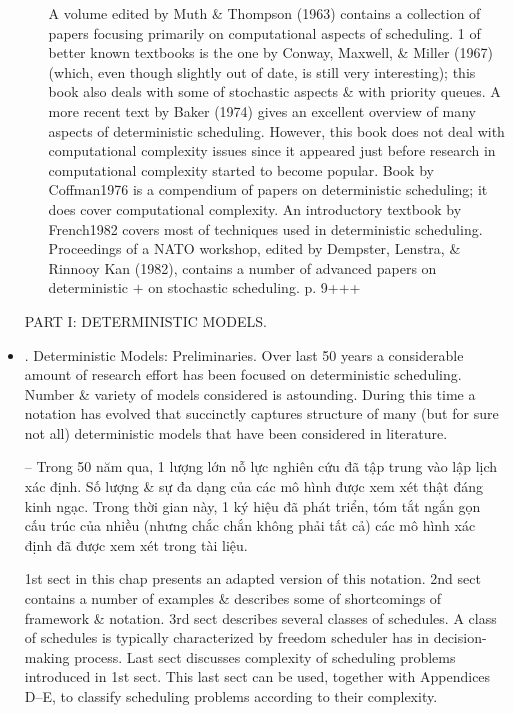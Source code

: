 \documentclass{article}
\begin{document}
\begin{itemize}
\begin{itemize}
        A volume edited by Muth \& Thompson (1963) contains a collection of papers focusing primarily on computational aspects of scheduling. 1 of better known textbooks is the one by Conway, Maxwell, \& Miller (1967) (which, even though slightly out of date, is still very interesting); this book also deals with some of stochastic aspects \& with priority queues. A more recent text by Baker (1974) gives an excellent overview of many aspects of deterministic scheduling. However, this book does not deal with computational complexity issues since it appeared just before research in computational complexity started to become popular. Book by Coffman1976 is a compendium of papers on deterministic scheduling; it does cover computational complexity. An introductory textbook by French1982 covers most of techniques used in deterministic scheduling. Proceedings of a NATO workshop, edited by Dempster, Lenstra, \& Rinnooy Kan (1982), contains a number of advanced papers on deterministic $+$ on stochastic scheduling. p. 9+++
    \end{itemize}
    PART I: DETERMINISTIC MODELS.
    \item {. Deterministic Models: Preliminaries.} Over last 50 years a considerable amount of research effort has been focused on deterministic scheduling. Number \& variety of models considered is astounding. During this time a notation has evolved that succinctly captures structure of many (but for sure not all) deterministic models that have been considered in literature.

    -- Trong 50 năm qua, 1 lượng lớn nỗ lực nghiên cứu đã tập trung vào lập lịch xác định. Số lượng \& sự đa dạng của các mô hình được xem xét thật đáng kinh ngạc. Trong thời gian này, 1 ký hiệu đã phát triển, tóm tắt ngắn gọn cấu trúc của nhiều (nhưng chắc chắn không phải tất cả) các mô hình xác định đã được xem xét trong tài liệu.

    1st sect in this chap presents an adapted version of this notation. 2nd sect contains a number of examples \& describes some of shortcomings of framework \& notation. 3rd sect describes several classes of schedules. A class of schedules is typically characterized by freedom scheduler has in decision-making process. Last sect discusses complexity of scheduling problems introduced in 1st sect. This last sect can be used, together with Appendices D--E, to classify scheduling problems according to their complexity.


\end{itemize}
\end{document}
